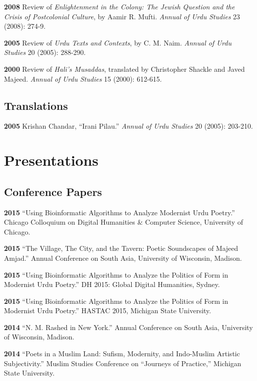 \documentclass[letterpaper,12pt]{article}
\begin{document}
\textbf{2008}
Review of \emph{Enlightenment in the Colony:
The Jewish Question and the Crisis of Postcolonial Culture},
by Aamir R. Mufti.
\emph{Annual of Urdu Studies} 23 (2008): 274-9.

\textbf{2005}
Review of \emph{Urdu Texts and Contexts},
by C. M. Naim.
\emph{Annual of Urdu Studies} 20 (2005): 288-290.

\textbf{2000}
Review of \emph{Hali’s Musaddas},
translated by Christopher Shackle and Javed Majeed.
\emph{Annual of Urdu Studies} 15 (2000): 612-615.


\subsection{Translations%
  \label{translations}%
}

\textbf{2005} Krishan Chandar, “Irani Pilau.”
\emph{Annual of Urdu Studies} 20 (2005): 203-210.


\section{Presentations%
  \label{presentations}%
}


\subsection{Conference Papers%
  \label{conference-papers}%
}

\textbf{2015}
“Using Bioinformatic Algorithms to Analyze Modernist Urdu Poetry.”
Chicago Colloquium on Digital Humanities \& Computer Science, University of Chicago.

\textbf{2015}
“The Village, The City, and the Tavern: Poetic Soundscapes of Majeed Amjad.”
Annual Conference on South Asia, University of Wisconsin, Madison.

\textbf{2015}
“Using Bioinformatic Algorithms to Analyze the Politics of Form in Modernist Urdu Poetry.”
DH 2015: Global Digital Humanities, Sydney.

\textbf{2015}
“Using Bioinformatic Algorithms to Analyze the Politics of Form in Modernist Urdu Poetry.”
HASTAC 2015, Michigan State University.

\textbf{2014}
“N. M. Rashed in New York.”
Annual Conference on South Asia,
University of Wisconsin, Madison.

\textbf{2014}
“Poets in a Muslim Land:
Sufism, Modernity, and Indo-Muslim Artistic Subjectivity.”
Muslim Studies Conference on “Journeys of Practice,”
Michigan State University.
\end{document}
